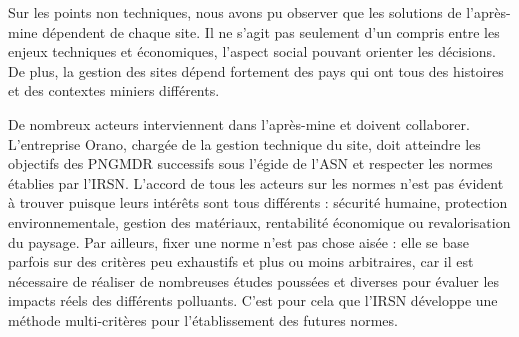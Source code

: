 \documentclass{article}
\begin{document}
Sur les points non techniques, nous avons pu observer que les solutions de l'après-mine dépendent de chaque site. Il ne s'agit pas seulement d'un compris entre les enjeux techniques et économiques, l'aspect social pouvant orienter les décisions. De plus, la gestion des sites dépend fortement des pays qui ont tous des histoires et des contextes miniers différents.

De nombreux acteurs interviennent dans l'après-mine et doivent collaborer. L'entreprise Orano, chargée de la gestion technique du site, doit atteindre les objectifs des PNGMDR successifs sous l'égide de l'ASN et respecter les normes établies par l'IRSN. L'accord de tous les acteurs sur les normes n'est pas évident à trouver puisque leurs intérêts sont tous différents : sécurité humaine, protection environnementale, gestion des matériaux, rentabilité économique ou revalorisation du paysage. Par ailleurs, fixer une norme n'est pas chose aisée : elle se base parfois sur des critères peu exhaustifs et plus ou moins arbitraires, car il est nécessaire de réaliser de nombreuses études poussées et diverses pour évaluer les impacts réels des différents polluants. C'est pour cela que l'IRSN développe une méthode multi-critères pour l'établissement des futures normes.

\end{document}
